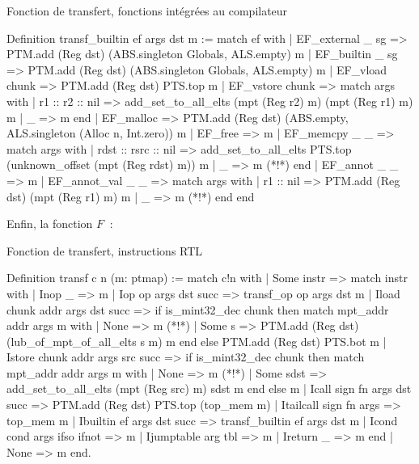 \documentclass{article}
\newcommand\mi{\mathit}
\newcommand\F[1]{F_{\mi{#1}}}
\begin{document}
\begin{coqcode}
\caption{Fonction de transfert, fonctions intégrées au compilateur}
\begin{english}
\begin{coq}
Definition transf_builtin ef args dst m :=
  match ef with
  | EF_external _ sg => PTM.add (Reg dst) (ABS.singleton Globals, ALS.empty) m
  | EF_builtin _ sg  => PTM.add (Reg dst) (ABS.singleton Globals, ALS.empty) m
  | EF_vload chunk   => PTM.add (Reg dst) PTS.top m
  | EF_vstore chunk  =>
    match args with
    | r1 :: r2 :: nil =>
      add_set_to_all_elts (mpt (Reg r2) m) (mpt (Reg r1) m) m
    | _               => m
    end
  | EF_malloc        =>
      PTM.add (Reg dst) (ABS.empty, ALS.singleton (Alloc n, Int.zero)) m
  | EF_free          => m
  | EF_memcpy _ _    =>
    match args with
    | rdst :: rsrc :: nil =>
      add_set_to_all_elts PTS.top (unknown_offset (mpt (Reg rdst) m)) m
    | _                   => m (*!*)
    end
  | EF_annot _ _     => m
  | EF_annot_val _ _ =>
    match args with
    | r1 :: nil => PTM.add (Reg dst) (mpt (Reg r1) m) m
    | _         => m (*!*)
    end
  end
\end{coq}
\end{english}
\end{coqcode}

\newpage

Enfin, la fonction $\F{}$~:

\begin{coqcode}
\caption{Fonction de transfert, instructions RTL}
\begin{english}
\begin{coq}
Definition transf c n (m: ptmap) :=
  match c!n with
    | Some instr =>
      match instr with
        | Inop _                          => m
        | Iop op args dst succ            => transf_op op args dst m
        | Iload chunk addr args dst succ  =>
          if is_mint32_dec chunk
            then
              match mpt_addr addr args m with
                | None   => m (*!*)
                | Some s =>
                  PTM.add (Reg dst) (lub_of_mpt_of_all_elts s m) m
              end
            else
              PTM.add (Reg dst) PTS.bot m
        | Istore chunk addr args src succ =>
          if is_mint32_dec chunk
            then
              match mpt_addr addr args m with
                | None      => m (*!*)
                | Some sdst =>
                  add_set_to_all_elts (mpt (Reg src) m) sdst m
              end
            else
              m
        | Icall sign fn args dst succ     =>
          PTM.add (Reg dst) PTS.top (top_mem m)
        | Itailcall sign fn args          => top_mem m
        | Ibuiltin ef args dst succ       => transf_builtin ef args dst m
        | Icond cond args ifso ifnot      => m
        | Ijumptable arg tbl              => m
        | Ireturn _                       => m
      end
    | None       => m
  end.
\end{coq}
\end{english}
\end{coqcode}

\newpage

\printglossary[title=Glossaire, toctitle=Glossaire, style=altlist,
nonumberlist]

\newpage



\end{document}
